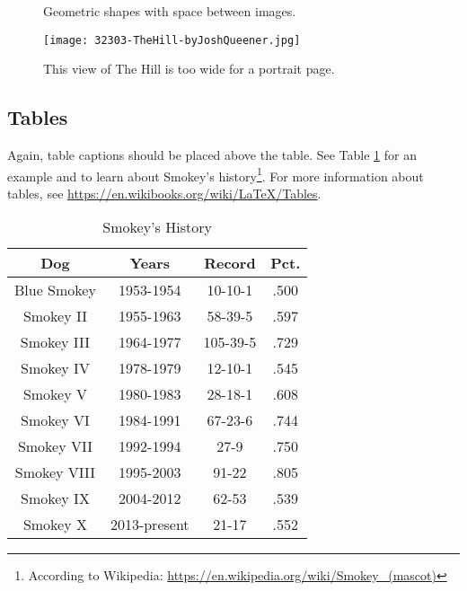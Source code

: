 \begin{figure}[h]
        \centering
         \qquad
        \qquad
        \qquad
        \caption{Geometric shapes with space between images.}
        \label{fig:multipart-figure-space}
\end{figure} 

\begin{landscape}
\thispagestyle{mylandscape}
	\begin{figure}[h]
		\centering
		\texttt{[image: 32303-TheHill-byJoshQueener.jpg]}
		\caption{This view of The Hill is too wide for a portrait page.}
		\label{fig:wide-pic}
	\end{figure}
\end{landscape}

\subsection{Tables}
Again, table captions should be placed above the table. See Table \ref{tab:table-a} for an example and to learn about Smokey's history\footnote{According to Wikipedia: \href{https://en.wikipedia.org/wiki/Smokey_(mascot)}{https://en.wikipedia.org/wiki/Smokey\_(mascot)}}. For more information about tables, see \href{https://en.wikibooks.org/wiki/LaTeX/Tables}{https://en.wikibooks.org/wiki/LaTeX/Tables}.

\begin{table}[hb]
\caption{Smokey's History}
\label{tab:table-a}
\begin{center}
\begin{tabular}[b]{|c|c|c|c|}
	\hline
	Dog & Years & Record & Pct. \\ \hline
	Blue Smokey & 1953-1954 & 10-10-1 & .500 \\ \hline
	Smokey II & 1955-1963 & 58-39-5 & .597 \\ \hline
	Smokey III & 1964-1977 & 105-39-5 & .729 \\ \hline
	Smokey IV & 1978-1979 & 12-10-1 & .545 \\ \hline
	Smokey V & 1980-1983 & 28-18-1 & .608 \\ \hline
	Smokey VI & 1984-1991 & 67-23-6 & .744 \\ \hline
	Smokey VII & 1992-1994 & 27-9 & .750 \\ \hline
	Smokey VIII & 1995-2003 & 91-22 & .805 \\ \hline
	Smokey IX & 2004-2012 & 62-53 & .539 \\ \hline
	Smokey X & 2013-present & 21-17 & .552 \\ \hline
\end{tabular}
\end{center}
\end{table}



